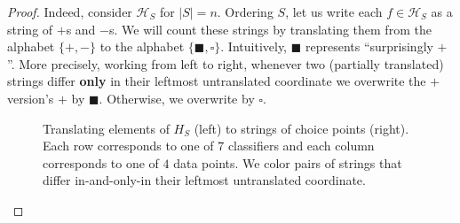 \documentclass[twocolumn]{article}
\newcommand{\Hh}{\mathcal{H}}
\theoremstyle{definition}
\begin{document}
        \begin{proof}
        Indeed, consider $\Hh_S$ for $|S|=n$.  Ordering $S$,
        let us write each $f\in \Hh_S$ as a string of $+$s
        and $-$s.  We will count these strings by translating them from the
        alphabet $\{+,-\}$ to the alphabet $\{\blacksquare,\square\}$.
        Intuitively, $\blacksquare$ represents ``surprisingly $+$''.
        More precisely, working from left to right, whenever two
        (partially translated) strings differ \textbf{only} in their
        leftmost untranslated coordinate we overwrite the $+$ version's
        $+$ by $\blacksquare$.  Otherwise, we overwrite by $\square$.

        \newcommand{\rR}[1]{{\color{moor}#1}}
        \newcommand{\gG}[1]{{\color{moog}#1}}
        \newcommand{\bB}[1]{{\color{moob}#1}}
        \newcommand{\E}{\texttt{$\square$}}
        \newcommand{\D}{\texttt{$\blacksquare$}}
        \newcommand{\A}{\texttt{$\bm{+}$}}
        \newcommand{\M}{\texttt{$\bm{-}$}}
        \begin{figure}[h]
            \centering
            \resizebox{\columnwidth}{!}{
                \begin{tabular}{ccccccccc}
                       \A \M \M \M  &       &  \E \gG\M \M \M  &       &  \E \E \rR\M \M  &       &  \E \E \E \rR\M  &       &  \E \E \E \E  \\
                       \M \A \M \M  &       &  \E \gG\A \M \M  &       &  \E \D    \M \M  &       &  \E \D \E \bB\M  &       &  \E \D \E \E  \\
                       \M \M \A \M  &       &  \E    \M \A \M  &       &  \E \E \rR\A \M  &       &  \E \E \D \gG\M  &       &  \E \E \D \E  \\
                       \M \M \M \A  & $\to$ &  \E    \M \M \A  & $\to$ &  \E \E \gG\M \A  & $\to$ &  \E \E \E \rR\A  & $\to$ &  \E \E \E \D  \\
                       \M \M \A \A  &       &  \E \bB\M \A \A  &       &  \E \E \gG\A \A  &       &  \E \E \D \gG\A  &       &  \E \E \D \D  \\
                    \rR\M \A \A \A  &       &  \E \bB\A \A \A  &       &  \E \D    \A \A  &       &  \E \D \E \bB\A  &       &  \E \D \E \D  \\
                    \rR\A \A \A \A  &       &  \D    \A \A \A  &       &  \D \E    \A \A  &       &  \D \E \E    \A  &       &  \D \E \E \E
                \end{tabular}
            }
            \caption{
                Translating elements of $H_S$ (left) to strings of choice
                points (right).  Each row corresponds to one of $7$ classifiers
                and each column corresponds to one of $4$ data points.
                We color pairs of strings that differ in-and-only-in their
                leftmost untranslated coordinate.
            }
            \label{fig:sauer}
        \end{figure}


\end{proof}
\end{document}
